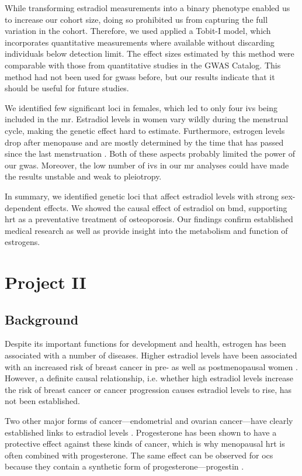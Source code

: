 \documentclass[draft]{scrbook}
\begin{document}
While transforming estradiol measurements into a binary phenotype enabled us to increase our cohort size, doing so prohibited us from capturing the full variation in the cohort.
Therefore, we used applied a Tobit-I model, which incorporates quantitative measurements where available without discarding individuals below detection limit.
The effect sizes estimated by this method were comparable with those from quantitative studies in the GWAS Catalog.
This method had not been used for \glspl{gwas} before, but our results indicate that it should be useful for future studies.

We identified few significant loci in females, which led to only four \glspl{iv} being included in the \gls{mr}.
Estradiol levels in women vary wildly during the menstrual cycle, making the genetic effect hard to estimate.
Furthermore, estrogen levels drop after menopause and are mostly determined by the time that has passed since the last menstruation \cite{Richardson2020}.
Both of these aspects probably limited the power of our \gls{gwas}.
Moreover, the low number of \glspl{iv} in our \gls{mr} analyses could have made the results unstable and weak to pleiotropy.

In summary, we identified genetic loci that affect estradiol levels with strong sex-dependent effects.
We showed the causal effect of estradiol on \gls{bmd}, supporting \gls{hrt} as a preventative treatment of osteoporosis.
Our findings confirm established medical research as well as provide insight into the metabolism and function of estrogens.

\chapter{Project II}
\section{Background}
Despite its important functions for development and health, estrogen has been associated with a number of diseases.
Higher estradiol levels have been associated with an increased risk of breast cancer in pre- as well as postmenopausal women \cite{Key2013,Kaaks2005,Zhang2013,Kaaks2005a}.
However, a definite causal relationship, i.e. whether high estradiol levels increase the risk of breast cancer or cancer progression causes estradiol levels to rise, has not been established.

Two other major forms of cancer---endometrial and ovarian cancer---have clearly established links to estradiol levels \cite{Brinton2014,Mungenast2014}.
Progesterone has been shown to have a protective effect against these kinds of cancer, which is why menopausal \gls{hrt} is often combined with progesterone.
The same effect can be observed for \glspl{oc} because they contain a synthetic form of progesterone---progestin \cite{Karlsson2021,Iversen2017}.
\end{document}
